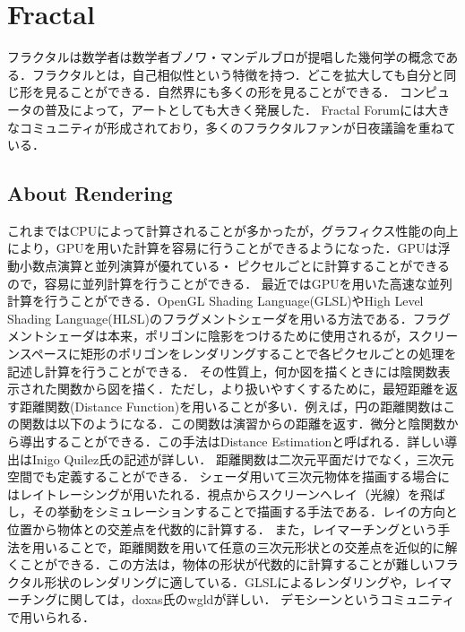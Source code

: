\section{Fractal}
フラクタルは数学者は数学者ブノワ・マンデルブロが提唱した幾何学の概念である．フラクタルとは，自己相似性という特徴を持つ．どこを拡大しても自分と同じ形を見ることができる．自然界にも多くの形を見ることができる．
コンピュータの普及によって，アートとしても大きく発展した．
Fractal Forumには大きなコミュニティが形成されており，多くのフラクタルファンが日夜議論を重ねている．

\subsection{About Rendering}
これまではCPUによって計算されることが多かったが，グラフィクス性能の向上により，GPUを用いた計算を容易に行うことができるようになった．GPUは浮動小数点演算と並列演算が優れている・
ピクセルごとに計算することができるので，容易に並列計算を行うことができる．
最近ではGPUを用いた高速な並列計算を行うことができる．OpenGL Shading Language(GLSL)やHigh Level Shading Language(HLSL)のフラグメントシェーダを用いる方法である．フラグメントシェーダは本来，ポリゴンに陰影をつけるために使用されるが，スクリーンスペースに矩形のポリゴンをレンダリングすることで各ピクセルごとの処理を記述し計算を行うことができる．
その性質上，何か図を描くときには陰関数表示された関数から図を描く．ただし，より扱いやすくするために，最短距離を返す距離関数(Distance Function)を用いることが多い．例えば，円の距離関数はこの関数は以下のようになる．この関数は演習からの距離を返す．微分と陰関数から導出することができる．この手法はDistance Estimationと呼ばれる．詳しい導出はInigo Quilez氏の記述が詳しい．
距離関数は二次元平面だけでなく，三次元空間でも定義することができる．
シェーダ用いて三次元物体を描画する場合にはレイトレーシングが用いたれる．視点からスクリーンへレイ（光線）を飛ばし，その挙動をシミュレーションすることで描画する手法である．レイの方向と位置から物体との交差点を代数的に計算する．
また，レイマーチングという手法を用いることで，距離関数を用いて任意の三次元形状との交差点を近似的に解くことができる．この方法は，物体の形状が代数的に計算することが難しいフラクタル形状のレンダリングに適している．GLSLによるレンダリングや，レイマーチングに関しては，doxas氏のwgldが詳しい．
デモシーンというコミュニティで用いられる．
